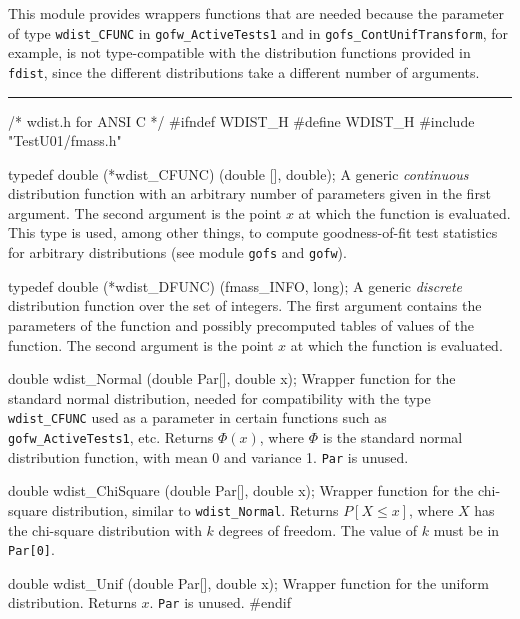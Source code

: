 
This module provides wrappers functions that are needed
because the parameter of type {\tt wdist\_CFUNC} in {\tt gofw\_ActiveTests1}
and in {\tt gofs\_ContUnifTransform}, for example, is not type-compatible
with the distribution functions provided in {\tt fdist}, since the different
distributions take a different number of arguments.


\bigskip\hrule
\code\hide
/* wdist.h for ANSI C */
#ifndef WDIST_H
#define WDIST_H
\endhide
#include "TestU01/fmass.h"
\endcode



\code

typedef double (*wdist_CFUNC) (double [], double);
\endcode
  \tab A generic {\em continuous\/} distribution function with an 
  arbitrary number of parameters given in the first argument.
  The second argument is the point $x$ at which the function is evaluated.
 \ifdetailed  %
  This type is used, among other things, to compute goodness-of-fit
  test statistics for arbitrary distributions (see module {\tt gofs} and
  {\tt gofw}).
 \fi %
 \endtab
\code


typedef double (*wdist_DFUNC) (fmass_INFO, long);
\endcode
  \tab A generic {\em discrete\/} distribution function over the set of
  integers.
  The first argument contains the parameters of the function and 
  possibly precomputed tables of values of the function.
  The second argument is the point $x$ at which the function is evaluated.
 \endtab




\code

double wdist_Normal (double Par[], double x);
\endcode
\tab
  Wrapper function for the {standard normal} distribution, needed
  for compatibility with the type {\tt wdist\_CFUNC} used as a parameter
  in certain functions such as {\tt gofw\_ActiveTests1}, etc.
  Returns $\Phi(x)$, where $\Phi$ is the standard normal distribution
  function, with mean 0 and variance 1.
  {\tt Par} is unused.
\endtab
\code


double wdist_ChiSquare (double Par[], double x);
\endcode
\tab
   Wrapper function for the {chi-square} distribution, similar to
   {\tt wdist\_Normal}.
   Returns $P[X \le x]$, where $X$ has the chi-square distribution 
   with $k$ degrees of freedom.  The value of $k$ must be in {\tt Par[0]}. 
\endtab
\code


double wdist_Unif (double Par[], double x);
\endcode
\tab
  Wrapper function for the {uniform} distribution.
  Returns $x$. {\tt Par} is unused.
\endtab
\code
\hide
#endif
\endhide
\endcode
